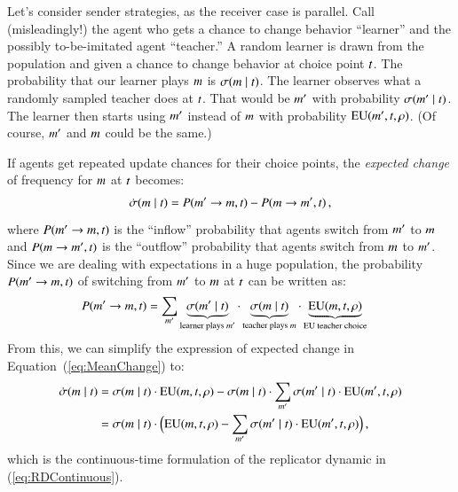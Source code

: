 \documentclass[fleqn,reqno,10pt]{article}
\begin{document}
Let's consider sender strategies, as the receiver case is parallel. Call (misleadingly!) the
agent who gets a chance to change behavior ``learner'' and the possibly to-be-imitated agent
``teacher.'' A random learner is drawn from the population and given a chance to change
behavior at choice point $t$. The probability that our learner plays $m$ is
$\sigma(m \mid t)$. The learner observes what a randomly sampled teacher does at
$t$. That would be $m'$ with probability $\sigma(m' \mid t)$. The
learner then starts using $m'$ instead of $m$ with probability
$\mathrm{EU}(m', t, \rho)$. (Of course, $m'$ and $m$ could be the same.)

If agents get repeated update chances for their choice points, the \emph{expected change} of
frequency for $m$ at $t$ becomes:
\begin{align}
  \label{eq:MeanChange}
  \dot{\sigma}(m \mid t) = P(m' \rightarrow m, t) - P(m \rightarrow m', t)\,,
\end{align}
where $P(m' \rightarrow m, t)$ is the ``inflow'' probability that agents switch from
$m'$ to $m$ and $P(m \rightarrow m', t)$ is the ``outflow'' probability
that agents switch from $m$ to $m'$. Since we are dealing with expectations in a huge
population, the probability $P(m' \rightarrow m, t)$ of switching from $m'$ to
$m$ at $t$ can be written as:
\begin{align*}
  P(m' \rightarrow m, t) & = \sum_{m'} \underbrace{\sigma(m' \mid
    t)}_{\text{learner plays $m'$}} \cdot
  \underbrace{\sigma(m \mid t)}_{\text{teacher plays $m$}} \cdot
  \underbrace{\mathrm{EU}(m, t, \rho)}_{\text{EU teacher choice}} 
\end{align*}
From this, we can simplify the expression of expected change in Equation~(\ref{eq:MeanChange})
to:
\begin{align*}
  \dot{\sigma}(m \mid t) & = \sigma(m \mid t) \cdot \mathrm{EU}(m,
  t, \rho) - \sigma(m \mid t) \cdot  \sum_{m'}
      \sigma(m' \mid t) \cdot \mathrm{EU}(m',t,\rho) \\
& = \sigma(m \mid t) \cdot \Big ( \mathrm{EU}(m, t,\rho) - \sum_{m'} \sigma(m' \mid t) \cdot \mathrm{EU}(m',
  t,\rho) \Big )\,,
\end{align*}
which is the continuous-time formulation of the replicator dynamic in (\ref{eq:RDContinuous}).
\end{document}
